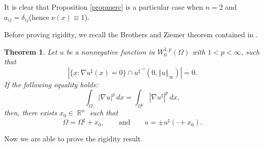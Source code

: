 \documentclass[oneside,a4paper,11pt,notitlepage]{article}
\newcommand{\abs}[1]{{\left|#1\right|}}
\newcommand{\norma}[1]{{\left\Vert#1\right\Vert}}
\theoremstyle{definition}
\theoremstyle{plain}
\newtheorem{theorem}{Theorem}[section]
\theoremstyle{definition}
\DeclareMathOperator{\R}{\mathbb{R}}
\begin{document}
It is clear that Proposition \ref{propmerc} is a particular case when $n=2$ and $a_{ij}= \delta_{ij}$(hence $\nu(x)\equiv 1$).

Before proving rigidity, we recall  the Brothers and Ziemer theorem contained in \cite{BZ}.

\begin{theorem}\label{brotherziemer}
    Let $u$ be a nonnegative function in $W_0^{1,p}(\Omega)$ with $1<p<\infty$, such that
    \[\abs{\{x:\nabla u^\sharp(x)=0\}\cap u^{\sharp^{-1}}(0,\norma{u}_\infty)}=0.\]
 If the following equality holds:
    \[\int_\Omega\abs{\nabla u}^p\,dx=\int_{\Omega^\sharp}\abs{\nabla u^\sharp}^p\,dx,\]
    then, there exists $x_0 \in \R^n$ such that $$\Omega= \Omega^\sharp+ x_0, \qquad \text{and} \qquad u=\pm u^\sharp(\cdot +x_0).$$
\end{theorem}
Now we are able to prove the rigidity result.
\end{document}
